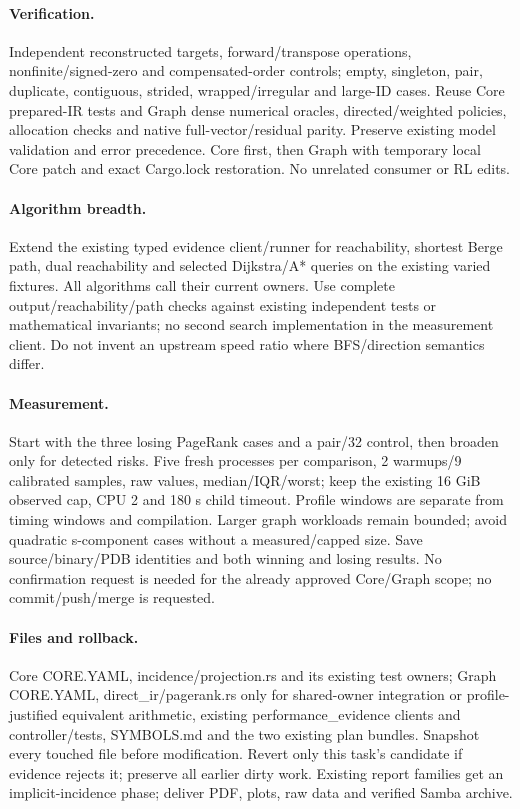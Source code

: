 \documentclass[11pt]{article}
\begin{document}
\paragraph{Verification.} Independent reconstructed targets, forward/transpose
operations, nonfinite/signed-zero and compensated-order controls; empty, singleton,
pair, duplicate, contiguous, strided, wrapped/irregular and large-ID cases. Reuse
Core prepared-IR tests and Graph dense numerical oracles, directed/weighted policies,
allocation checks and native full-vector/residual parity. Preserve existing model
validation and error precedence. Core first, then Graph with temporary local Core
patch and exact Cargo.lock restoration. No unrelated consumer or RL edits.
\paragraph{Algorithm breadth.} Extend the existing typed evidence client/runner
for reachability, shortest Berge path, dual reachability and selected Dijkstra/A*
queries on the existing varied fixtures. All algorithms call their current owners.
Use complete output/reachability/path checks against existing independent tests or
mathematical invariants; no second search implementation in the measurement client.
Do not invent an upstream speed ratio where BFS/direction semantics differ.
\paragraph{Measurement.} Start with the three losing PageRank cases and a pair/32
control, then broaden only for detected risks. Five fresh processes per comparison,
2 warmups/9 calibrated samples, raw values, median/IQR/worst; keep the existing
16 GiB observed cap, CPU 2 and 180 s child timeout. Profile windows are separate
from timing windows and compilation. Larger graph workloads remain bounded; avoid
quadratic s-component cases without a measured/capped size. Save source/binary/PDB
identities and both winning and losing results. No confirmation request is needed
for the already approved Core/Graph scope; no commit/push/merge is requested.
\paragraph{Files and rollback.} Core CORE.YAML, incidence/projection.rs and its
existing test owners; Graph CORE.YAML, direct\_ir/pagerank.rs only for shared-owner
integration or profile-justified equivalent arithmetic, existing performance\_evidence
clients and controller/tests, SYMBOLS.md and the two existing plan bundles.
Snapshot every touched file before modification. Revert only this task's candidate
if evidence rejects it; preserve all earlier dirty work. Existing report families
get an implicit-incidence phase; deliver PDF, plots, raw data and verified Samba archive.
\end{document}
